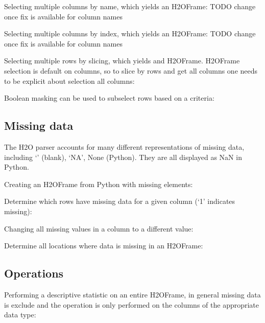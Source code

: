 Selecting multiple columns by name, which yields an H2OFrame:
TODO change once fix is available for column names


Selecting multiple columns by index, which yields an H2OFrame:
TODO change once fix is available for column names


Selecting multiple rows by slicing, which yields and H2OFrame.
H2OFrame selection is default on columns, so to slice by rows
and get all columns one needs to be explicit about selection all columns:


Boolean masking can be used to subselect rows based on a criteria:



\subsection{Missing data}
The H2O parser accounts for many different representations of missing data, including `' (blank),
`NA', None (Python).  They are all displayed as NaN in Python.

Creating an H2OFrame from Python with missing elements:


Determine which rows have missing data for a given column (`1' indicates missing):


Changing all missing values in a column to a different value:


Determine all locations where data is missing in an H2OFrame:


\subsection{Operations}
Performing a descriptive statistic on an entire H2OFrame, in general missing data is exclude
and the operation is only performed on the columns of the appropriate data type:


